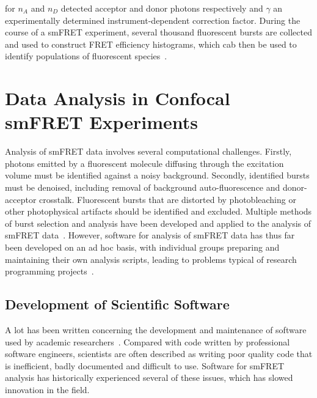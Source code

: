 for $n_A$ and $n_D$ detected acceptor and donor photons respectively and $\gamma$ an experimentally determined instrument-dependent correction factor. During the course of a smFRET experiment, several thousand fluorescent bursts are collected and used to construct FRET efficiency histograms, which cab then be used to identify populations of fluorescent species~\cite{ha96}.

\section{Data Analysis in Confocal smFRET Experiments}
Analysis of smFRET data involves several computational challenges. Firstly, photons emitted by a fluorescent molecule diffusing through the excitation volume must be identified against a noisy background. Secondly, identified bursts must be denoised, including removal of background auto-fluorescence and donor-acceptor crosstalk. Fluorescent bursts that are distorted by photobleaching or other photophysical artifacts should be identified and excluded. Multiple methods of burst selection and analysis have been developed and applied to the analysis of smFRET data~\cite{weiss00, deniz01, gell06, nir06, kapanidis05, muller05, doose07, kudryavtsev2012, eggeling01}. However, software for analysis of smFRET data has thus far been developed on an ad hoc basis, with individual groups preparing and maintaining their own analysis scripts, leading to problems typical of research programming projects~\cite{wilson06, merali10}.

\subsection{Development of Scientific Software}

A lot has been written concerning the development and maintenance of software used by academic researchers~\cite{wilson06, merali10}. Compared with code written by professional software engineers, scientists are often described as writing poor quality code that is inefficient, badly documented and difficult to use. Software for smFRET analysis has historically experienced several of these issues, which has slowed innovation in the field.



